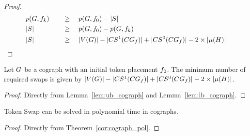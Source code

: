 \documentclass[msc,english,table,xcdraw]{ppgccufmg}
\begin{document}
\begin{proof}
\begin{alignat}{2}
\centering
\label{equ:lower_bound:cograph}
& \applyFunc{p}{\graphG, \mapFunc_{k}} \quad && \geq \quad \applyFunc{p}{\graphG, \mapFunc_{0}} - \sizeof{\swapSeq} \nonumber \\
&\sizeof{\swapSeq} \quad && \geq \quad \applyFunc{p}{\graphG, \mapFunc_{0}} - \applyFunc{p}{\graphG, \mapFunc_{k}} \nonumber \\
&\sizeof{\swapSeq} \quad && \geq \quad \sizeof{\vertexFunc{\graphG}} - 
\sizeof{\applyFunc{\oneCycles}{\conflictGraph_{\mapFunc}}} +
\sizeof{\applyFunc{\zeroCycles}{\conflictGraph_{\mapFunc}}} - 2\times\sizeof{\matchingOf
{\cycleMatchingGraph}}
\end{alignat}

\end{proof}

\begin{theorem}
\label{cor:cograph_pol}
Let $G$ be a cograph with an initial token placement $f_{0}$.
The minimum number of required swaps is given by $|V(G)| - 
|CS^{1}(CG_{f})| +
|CS^{0}(CG_{f})| - 2\times|\mu(H)|$.
\end{theorem}

\begin{proof}
Directly from Lemma~\ref{lem:ub_cograph} and Lemma~\ref{lem:lb_cograph}.
\end{proof}

\begin{corollary}
Token Swap can be solved in polynomial time in cographs.
\end{corollary}

\begin{proof}
Directly from Theorem~\ref{cor:cograph_pol}.
\end{proof}




\end{document}
